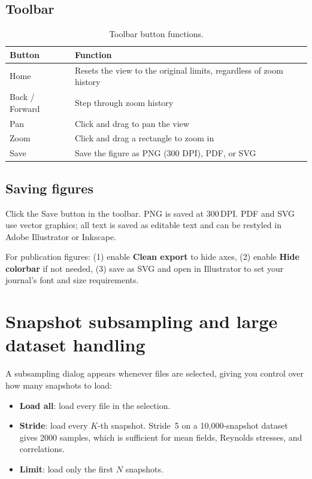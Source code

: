\documentclass[11pt, a4paper]{report}
\newcommand{\uipth}[1]{\textbf{\textcolor{upblue}{#1}}}
\begin{document}
\subsection{Toolbar}

\begin{table}[htbp]
\centering
\caption{Toolbar button functions.}
\begin{tabular}{ll}
\toprule
\textbf{Button} & \textbf{Function} \\
\midrule
Home           & Resets the view to the original limits, regardless of zoom history \\
Back / Forward & Step through zoom history \\
Pan            & Click and drag to pan the view \\
Zoom           & Click and drag a rectangle to zoom in \\
Save           & Save the figure as PNG (300 DPI), PDF, or SVG \\
\bottomrule
\end{tabular}
\end{table}

\subsection{Saving figures}

Click the Save button in the toolbar. PNG is saved at 300\,DPI. PDF and SVG use vector graphics; all text is saved as editable text and can be restyled in Adobe Illustrator or Inkscape.

\begin{tipbox}
For publication figures: (1) enable \uipth{Clean export} to hide axes, (2) enable \uipth{Hide colorbar} if not needed, (3) save as SVG and open in Illustrator to set your journal's font and size requirements.
\end{tipbox}

\section{Snapshot subsampling and large dataset handling}
\label{sec:subsample}

A subsampling dialog appears whenever files are selected, giving you control over how many snapshots to load:

\begin{itemize}[leftmargin=1.5em]
  \item \textbf{Load all}: load every file in the selection.
  \item \textbf{Stride}: load every $K$-th snapshot. Stride~5 on a 10,000-snapshot dataset gives 2000 samples, which is sufficient for mean fields, Reynolds stresses, and correlations.
  \item \textbf{Limit}: load only the first $N$ snapshots.
\end{itemize}
\end{document}
